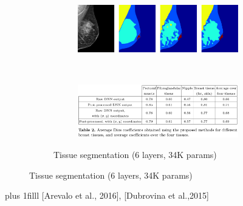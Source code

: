 \documentclass{beamer}
\newcommand{\source}[1]{\vskip0pt plus 1filll \scriptsize #1}
\begin{document}
\begin{frame}
\begin{figure}
\begin{subfigure}{0.48\textwidth}
\begin{subfigure}{\textwidth}
				\end{subfigure}
				~
				\begin{subfigure}{\textwidth}
					\includegraphics[width=\textwidth]{plots/dubrovina2.png}
				\end{subfigure}
				~
				\begin{subfigure}{\textwidth}
					\includegraphics[width=\textwidth]{plots/dubrovinaResults.png}
				\end{subfigure}
				\caption{Tissue segmentation (6 layers, 34K params)}
			\end{subfigure}
		\end{figure}
		\source{[Arevalo et al., 2016], [Dubrovina et al.,2015]}
	\end{frame}
	
\end{document}
